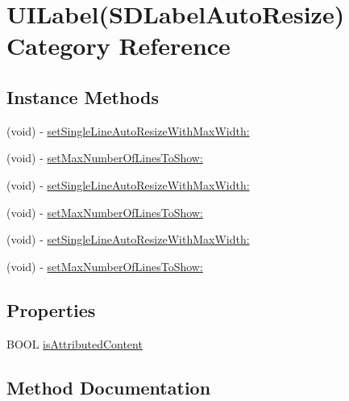 \hypertarget{category_u_i_label_07_s_d_label_auto_resize_08}{}\section{U\+I\+Label(S\+D\+Label\+Auto\+Resize) Category Reference}
\label{category_u_i_label_07_s_d_label_auto_resize_08}
\subsection*{Instance Methods}
\begin{DoxyCompactItemize}
\item 
(void) -\/ \mbox{\hyperlink{category_u_i_label_07_s_d_label_auto_resize_08_ab47002161295bce848c32310d1d0947c}{set\+Single\+Line\+Auto\+Resize\+With\+Max\+Width\+:}}
\item 
(void) -\/ \mbox{\hyperlink{category_u_i_label_07_s_d_label_auto_resize_08_a22eefe24a4a4109158c492e369fc048a}{set\+Max\+Number\+Of\+Lines\+To\+Show\+:}}
\item 
(void) -\/ \mbox{\hyperlink{category_u_i_label_07_s_d_label_auto_resize_08_ab47002161295bce848c32310d1d0947c}{set\+Single\+Line\+Auto\+Resize\+With\+Max\+Width\+:}}
\item 
(void) -\/ \mbox{\hyperlink{category_u_i_label_07_s_d_label_auto_resize_08_a22eefe24a4a4109158c492e369fc048a}{set\+Max\+Number\+Of\+Lines\+To\+Show\+:}}
\item 
(void) -\/ \mbox{\hyperlink{category_u_i_label_07_s_d_label_auto_resize_08_ab47002161295bce848c32310d1d0947c}{set\+Single\+Line\+Auto\+Resize\+With\+Max\+Width\+:}}
\item 
(void) -\/ \mbox{\hyperlink{category_u_i_label_07_s_d_label_auto_resize_08_a22eefe24a4a4109158c492e369fc048a}{set\+Max\+Number\+Of\+Lines\+To\+Show\+:}}
\end{DoxyCompactItemize}
\subsection*{Properties}
\begin{DoxyCompactItemize}
\item 
B\+O\+OL \mbox{\hyperlink{category_u_i_label_07_s_d_label_auto_resize_08_a667c636e1c009c48a350e4ce86701a5c}{is\+Attributed\+Content}}
\end{DoxyCompactItemize}


\subsection{Method Documentation}
\mbox{\label{category_u_i_label_07_s_d_label_auto_resize_08_a22eefe24a4a4109158c492e369fc048a}} 
